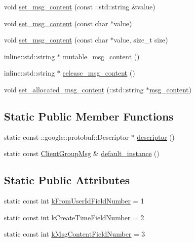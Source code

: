 \begin{DoxyCompactItemize}
\item 
void \hyperlink{class_i_m_1_1_base_define_1_1_client_group_msg_ae7eea2c2310ae120379bf80c1c50c31a}{set\+\_\+msg\+\_\+content} (const \+::std\+::string \&value)
\item 
void \hyperlink{class_i_m_1_1_base_define_1_1_client_group_msg_ad481813124610feb54664da59322e5af}{set\+\_\+msg\+\_\+content} (const char $\ast$value)
\item 
void \hyperlink{class_i_m_1_1_base_define_1_1_client_group_msg_aa5d4851debcc16277de287bc56fb837e}{set\+\_\+msg\+\_\+content} (const char $\ast$value, size\+\_\+t size)
\item 
inline\+::std\+::string $\ast$ \hyperlink{class_i_m_1_1_base_define_1_1_client_group_msg_add614e7f23d2b001fb677d7126b8c860}{mutable\+\_\+msg\+\_\+content} ()
\item 
inline\+::std\+::string $\ast$ \hyperlink{class_i_m_1_1_base_define_1_1_client_group_msg_a227b435ee81f64480c340ce6e950065a}{release\+\_\+msg\+\_\+content} ()
\item 
void \hyperlink{class_i_m_1_1_base_define_1_1_client_group_msg_a8e162a4ef209d63df769fcafd0966962}{set\+\_\+allocated\+\_\+msg\+\_\+content} (\+::std\+::string $\ast$\hyperlink{class_i_m_1_1_base_define_1_1_client_group_msg_a029b9e20847bb9fd49f895d55ab41a35}{msg\+\_\+content})
\end{DoxyCompactItemize}
\subsection*{Static Public Member Functions}
\begin{DoxyCompactItemize}
\item 
static const \+::google\+::protobuf\+::\+Descriptor $\ast$ \hyperlink{class_i_m_1_1_base_define_1_1_client_group_msg_a2f28f031861cf40940bbdcb340b259b0}{descriptor} ()
\item 
static const \hyperlink{class_i_m_1_1_base_define_1_1_client_group_msg}{Client\+Group\+Msg} \& \hyperlink{class_i_m_1_1_base_define_1_1_client_group_msg_a54687ec48802df5b8372c7ffb0dfe63d}{default\+\_\+instance} ()
\end{DoxyCompactItemize}
\subsection*{Static Public Attributes}
\begin{DoxyCompactItemize}
\item 
static const int \hyperlink{class_i_m_1_1_base_define_1_1_client_group_msg_a9b26ca334d1cb9b1a9384d212e7a9be2}{k\+From\+User\+Id\+Field\+Number} = 1
\item 
static const int \hyperlink{class_i_m_1_1_base_define_1_1_client_group_msg_afa887a9ca6b2943444617f3b2c31a24c}{k\+Create\+Time\+Field\+Number} = 2
\item 
static const int \hyperlink{class_i_m_1_1_base_define_1_1_client_group_msg_abf24f9d9e603bbd5c851df53e1af51b3}{k\+Msg\+Content\+Field\+Number} = 3
\end{DoxyCompactItemize}
